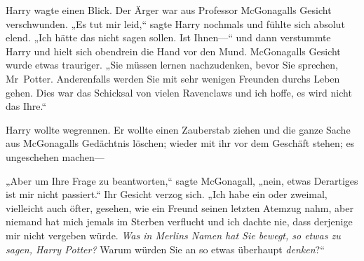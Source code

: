 Harry wagte einen Blick. Der Ärger war aus Professor McGonagalls Gesicht verschwunden. „Es tut mir leid,“ sagte Harry nochmals und fühlte sich absolut elend. „Ich hätte das nicht sagen sollen. Ist Ihnen—“ und dann verstummte Harry und hielt sich obendrein die Hand vor den Mund. McGonagalls Gesicht wurde etwas trauriger. „Sie müssen lernen nachzudenken, bevor Sie sprechen, Mr~Potter. Anderenfalls werden Sie mit sehr wenigen Freunden durchs Leben gehen. Dies war das Schicksal von vielen Ravenclaws und ich hoffe, es wird nicht das Ihre.“

Harry wollte wegrennen. Er wollte einen Zauberstab ziehen und die ganze Sache aus McGonagalls Gedächtnis löschen; wieder mit ihr vor dem Geschäft stehen; es ungeschehen machen—

„Aber um Ihre Frage zu beantworten,“ sagte McGonagall, „nein, etwas Derartiges ist mir nicht passiert.“ Ihr Gesicht verzog sich. „Ich habe ein oder zweimal, vielleicht auch öfter, gesehen, wie ein Freund seinen letzten Atemzug nahm, aber niemand hat mich jemals im Sterben verflucht und ich dachte nie, dass derjenige mir nicht vergeben würde. \emph{Was in Merlins Namen hat Sie bewegt, so etwas zu sagen, Harry Potter?} Warum würden Sie an so etwas überhaupt \emph{denken}?“

